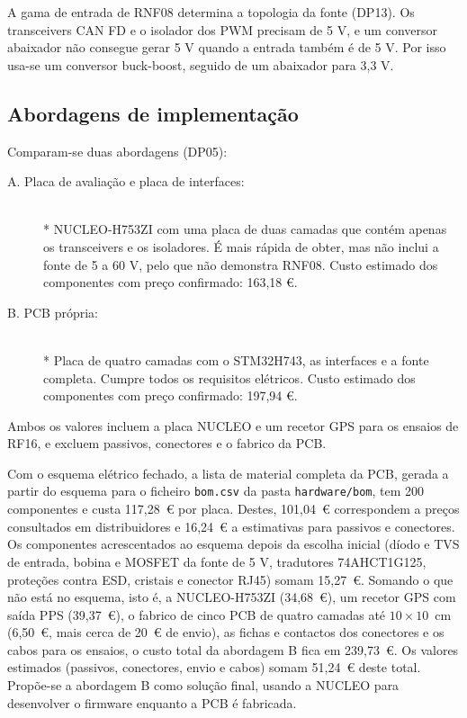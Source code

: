 A gama de entrada de RNF08 determina a topologia da fonte (DP13). Os
transceivers CAN FD e o isolador dos PWM precisam de 5 V, e um conversor
abaixador não consegue gerar 5 V quando a entrada também é de 5 V. Por
isso usa-se um conversor buck-boost, seguido de um abaixador para 3,3 V.

\subsection{Abordagens de implementação}

Comparam-se duas abordagens (DP05):
\begin{description}
    \item[A. Placa de avaliação e placa de interfaces:] \hfill\\*
    NUCLEO-H753ZI com uma placa de duas camadas que contém apenas os
    transceivers e os isoladores. É mais rápida de obter, mas não inclui
    a fonte de 5 a 60 V, pelo que não demonstra RNF08. Custo estimado dos
    componentes com preço confirmado: 163,18 €.
    \item[B. PCB própria:] \hfill\\*
    Placa de quatro camadas com o STM32H743, as interfaces e a fonte
    completa. Cumpre todos os requisitos elétricos. Custo estimado dos
    componentes com preço confirmado: 197,94 €.
\end{description}

Ambos os valores incluem a placa NUCLEO e um recetor GPS para os ensaios
de RF16, e excluem passivos, conectores e o fabrico da PCB.

Com o esquema elétrico fechado, a lista de material completa da PCB,
gerada a partir do esquema para o ficheiro \texttt{bom.csv} da pasta
\texttt{hardware/bom}, tem 200 componentes e custa 117,28~€ por placa. Destes, 101,04~€ correspondem a
preços consultados em distribuidores e 16,24~€ a estimativas para
passivos e conectores. Os componentes acrescentados ao esquema depois da
escolha inicial (díodo e TVS de entrada, bobina e MOSFET da fonte de 5 V,
tradutores 74AHCT1G125, proteções contra ESD, cristais e conector RJ45)
somam 15,27~€.
Somando o que não está no esquema, isto é, a NUCLEO-H753ZI (34,68~€), um
recetor GPS com saída PPS (39,37~€), o fabrico de cinco PCB de quatro
camadas até $10 \times 10$~cm (6,50~€, mais cerca de 20~€ de envio), as
fichas e contactos dos conectores e os cabos para os ensaios, o custo
total da abordagem B fica em 239,73~€. Os valores estimados (passivos,
conectores, envio e cabos) somam 51,24~€ deste total. Propõe-se a abordagem B como solução
final, usando a NUCLEO para desenvolver o firmware enquanto a PCB é
fabricada.

